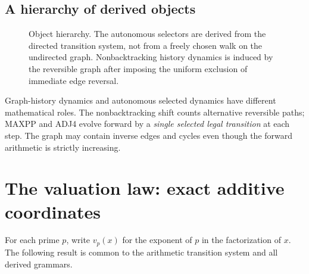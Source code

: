 \documentclass[11pt,a4paper]{article}
\theoremstyle{definition}\newtheorem{definition}[theorem]{Definition}
\newcommand{\N}{\mathbb N}
\newcommand{\NB}{\mathrm{NB}}
\begin{document}
\subsection{A hierarchy of derived objects}
\begin{figure}[htbp]
\centering
{}
\caption{Object hierarchy. The autonomous selectors are derived from the directed transition system, not from a freely chosen walk on the undirected graph. Nonbacktracking history dynamics is induced by the reversible graph after imposing the uniform exclusion of immediate edge reversal.}
\label{fig:hierarchy}
\end{figure}

Graph-history dynamics and autonomous selected dynamics have different mathematical roles. The nonbacktracking shift counts alternative reversible paths; MAXPP and ADJ4 evolve forward by a \emph{single selected legal transition} at each step. The graph may contain inverse edges and cycles even though the forward arithmetic is strictly increasing.

\section{The valuation law: exact additive coordinates}
\label{sec:valuation}
For each prime $p$, write $v_p(x)$ for the exponent of $p$ in the factorization of $x$. The following result is common to the arithmetic transition system and all derived grammars.
\end{document}
